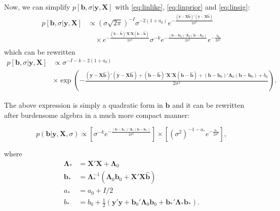 Now, we can simplify $p[\textbf{b},\sigma|\textbf{y},\textbf{X}]$ with \ref{eq:linlike}, \ref{eq:linprior} and \ref{eq:linsig}:
\begin{align*}
p[\textbf{b},\sigma|\textbf{y},\textbf{X}]& \propto 
(\sigma\sqrt{2\pi})^{-I} \sigma^{-2(1+a_0)} e^{-\frac{\left(\textbf{y}-\textbf{X}\hat{\textbf{b}}\right)' \left(\textbf{y}-\textbf{X}\hat{\textbf{b}}\right)}{2\sigma^2}} \\
&\quad \times e^{-\frac{(\textbf{b}-\hat{\textbf{b}})'\textbf{X}'\textbf{X}(\textbf{b}-\hat{\textbf{b}})}{2\sigma^2}}\sigma^{-k}e^{-\frac{(\textbf{b}-\textbf{b}_0)'\boldsymbol{\Lambda}_0(\textbf{b}-\textbf{b}_0)}{2\sigma^2}}e^{-\frac{b_0}{2\sigma^2}} \\
\end{align*}
which can be rewritten
\begin{align*}
p[\textbf{b},\sigma|\textbf{y},\textbf{X}]& \propto  \sigma^{-I-k-2(1+a_0)} \\
&\times  \exp\left(-\frac{\left(\textbf{y}-\textbf{X}\hat{\textbf{b}}\right)' \left(\textbf{y}-\textbf{X}\hat{\textbf{b}}\right) + (\textbf{b}-\hat{\textbf{b}})'\textbf{X}'\textbf{X}(\textbf{b}-\hat{\textbf{b}}) + (\textbf{b}-\textbf{b}_0)'\boldsymbol{\Lambda}_0(\textbf{b}-\textbf{b}_0)+b_0}{2\sigma^2} \right) .
\end{align*}

The above expression is simply a quadratic form in $\textbf{b}$ and it can be rewritten after burdensome algebra in a much more compact manner:

\begin{equation}
\label{eq:linpost}
p(\textbf{b}|\textbf{y},\textbf{X},\sigma) \propto \left[\sigma^{-k}e^{-\frac{(\textbf{b}-\textbf{b}_*)'\boldsymbol{\Lambda}_*(\textbf{b}-\textbf{b}_*)}{2\sigma^2}}\right] \times \left[ (\sigma^2)^{-1-a_*}e^{-\frac{b_*}{2\sigma^2}}  \right],
\end{equation}

where
\begin{align*}
\boldsymbol{\Lambda}_* &= \textbf{X}'\textbf{X}+\boldsymbol{\Lambda}_0  \\
\textbf{b}_*&=  \boldsymbol{\Lambda}_*^{-1}(\boldsymbol{\Lambda}_0\textbf{b}_0+\textbf{X}'\textbf{X}\hat{\textbf{b}}) \\
a_* & = a_0 + I/2  \\
b_* &=b_0+\frac{1}{2}\left(\textbf{y}'\textbf{y}+ \textbf{b}_0'\boldsymbol{\Lambda}_0\textbf{b}_0+\textbf{b}_*'\boldsymbol{\Lambda}_*\textbf{b}_* \right).\\
\end{align*}


